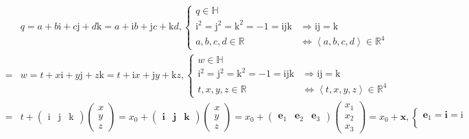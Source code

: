 \documentclass[
]{book}
\theoremstyle{definition}
\theoremstyle{definition}
\theoremstyle{definition}
\theoremstyle{definition}
\theoremstyle{remark}
\begin{document}
\[
\begin{aligned}
 & q=a+b\mathrm{i}+c\mathrm{j}+d\mathrm{k}=a+\mathrm{i}b+\mathrm{j}c+\mathrm{k}d,\begin{cases}
q\in\mathbb{H}\\
\mathrm{i}^{2}=\mathrm{j}^{2}=\mathrm{k}^{2}=-1=\mathrm{i}\mathrm{j}\mathrm{k} & \Rightarrow\mathrm{i}\mathrm{j}=\mathrm{k}\\
a,b,c,d\in\mathbb{R} & \Leftrightarrow\left\langle a,b,c,d\right\rangle \in\mathbb{R}^{4}
\end{cases}\\
= & w=t+x\mathrm{i}+y\mathrm{j}+z\mathrm{k}=t+\mathrm{i}x+\mathrm{j}y+\mathrm{k}z,\begin{cases}
w\in\mathbb{H}\\
\mathrm{i}^{2}=\mathrm{j}^{2}=\mathrm{k}^{2}=-1=\mathrm{i}\mathrm{j}\mathrm{k} & \Rightarrow\mathrm{i}\mathrm{j}=\mathrm{k}\\
t,x,y,z\in\mathbb{R} & \Leftrightarrow\left\langle t,x,y,z\right\rangle \in\mathbb{R}^{4}
\end{cases}\\
= & t+\begin{pmatrix}\mathrm{i} & \mathrm{j} & \mathrm{k}\end{pmatrix}\begin{pmatrix}x\\
y\\
z
\end{pmatrix}=x_{{\scriptscriptstyle 0}}+\begin{pmatrix}\boldsymbol{i} & \boldsymbol{j} & \boldsymbol{k}\end{pmatrix}\begin{pmatrix}x\\
y\\
z
\end{pmatrix}=x_{{\scriptscriptstyle 0}}+\begin{pmatrix}\boldsymbol{e}_{{\scriptscriptstyle 1}} & \boldsymbol{e}_{{\scriptscriptstyle 2}} & \boldsymbol{e}_{{\scriptscriptstyle 3}}\end{pmatrix}\begin{pmatrix}x_{{\scriptscriptstyle 1}}\\
x_{{\scriptscriptstyle 2}}\\
x_{{\scriptscriptstyle 3}}
\end{pmatrix}=x_{{\scriptscriptstyle 0}}+\boldsymbol{x},\begin{cases}
\boldsymbol{e}_{{\scriptscriptstyle 1}}=\boldsymbol{i}=\mathrm{i}\\

\end{cases}
\end{aligned}\]
\end{document}

